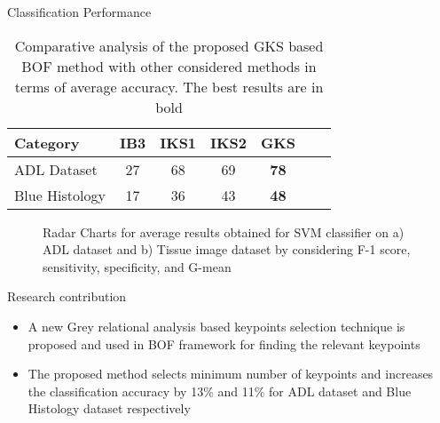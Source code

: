 \documentclass [9pt,times] {beamer}
\begin{document}
\begin{frame}{Classification Performance}
\begin{table}
\renewcommand{\arraystretch}{1.2}
	\centering
	\scriptsize
	\caption{{\scriptsize Comparative analysis of the proposed GKS based BOF method with other considered methods in terms of average accuracy. The best results are in bold	}}
	\label{tab:adl}
	\begin{tabular}{|p{1.2in}|c|c|c|c|c|c|}
		\hline
		\textbf{Category}   &	\textbf{IB3}	&	\textbf{IKS1}	&	\textbf{IKS2}	&	\textbf{GKS}	\\
		\hline
	ADL Dataset &  27 & 68 & 69 & \textbf{78}\\
	Blue Histology  &  17 & 36 & 43 & \textbf{48}\\
	\hline	
	\end{tabular}
\end{table}

\begin{figure}
\centering
{}
 \caption{{\scriptsize Radar Charts for average results obtained for SVM classifier on a) ADL dataset and b) Tissue image dataset by considering F-1 score, sensitivity, specificity, and G-mean}}
\label{fig:rc}
\end{figure}
\end{frame}


\begin{frame}{Research contribution}
\begin{itemize}
	\justifying
	\item A new Grey relational analysis based keypoints selection  technique is proposed and used in BOF framework for finding the relevant keypoints\\[3ex]
	
	\item The proposed method selects minimum number of keypoints and increases the classification accuracy by 13\% and 11\% for ADL dataset and Blue Histology dataset respectively
\end{itemize}


\end{frame}
\end{document}
